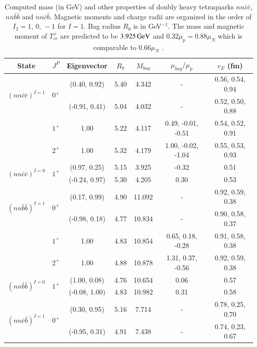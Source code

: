 \documentclass[12pt,prd,onecolumn,floatfix,nofootinbib]{revtex4}
\begin{document}
\renewcommand{\tabcolsep}{0.33cm} \renewcommand{\arraystretch}{1.1}
\begin{table}[!htb]
\caption{Computed mass (in GeV) and other properties of doubly heavy
tetraquarks $nn\bar{c}\bar{c}$, $nn\bar{b}\bar{b}$ and $nn\bar{c}\bar{b}$.
Magnetic moments and charge radii are organized in the order of $%
I_{3}=1,\,0,\,-1$ for $I=1$. Bag radius $R_{0}$ is in GeV$^{-1}$.
The mass and magnetic moment of $T_{cc}^{+}$ are predicted to be $3.925\,{\rm GeV}$ 
and $0.32\mu_{p}=0.88\mu_{N}$ which is comparable to $0.66\mu_{N}$ \cite%
{Azizi:2021aib}. }
\label{tab:2heavytetraquark1}%
\begin{tabular}{ccccccc}
\hline\hline
\textrm{State} & $J^{P}$ & \textrm{Eigenvector} & $R_{0}$ & $M_{bag}$ & $%
\mu_{bag}/\mu_{p}$ & $r_{E}$ (fm) \\ \hline
\multirow{2}{*}{${(nn\bar{c}\bar{c})}^{I=1}$} & \multirow{2}{*}{$0^{+}$} &
(0.40, 0.92) & 5.40 & 4.342 & - & 0.56, 0.54, 0.94 \\
&  & (-0.91, 0.41) & 5.04 & 4.032 & - & 0.52, 0.50, 0.88 \\
& $1^{+}$ & 1.00 & 5.22 & 4.117 & 0.49, -0.01, -0.51 & 0.54, 0.52, 0.91 \\
& $2^{+}$ & 1.00 & 5.32 & 4.179 & 1.00, -0.02, -1.04 & 0.55, 0.53, 0.93 \\
\multirow{2}{*}{${(nn\bar{c}\bar{c})}^{I=0}$} & \multirow{2}{*}{$1^{+}$} &
(0.97, 0.25) & 5.15 & 3.925 & -0.32 & 0.51 \\
&  & (-0.24, 0.97) & 5.30 & 4.205 & 0.30 & 0.53 \\
\multirow{2}{*}{${(nn\bar{b}\bar{b})}^{I=1}$} & \multirow{2}{*}{$0^{+}$} &
(0.17, 0.99) & 4.90 & 11.092 & - & 0.92, 0.59, 0.38 \\
&  & (-0.98, 0.18) & 4.77 & 10.834 & - & 0.90, 0.58, 0.37 \\
& $1^{+}$ & 1.00 & 4.83 & 10.854 & 0.65, 0.18, -0.28 & 0.91, 0.58, 0.38 \\
& $2^{+}$ & 1.00 & 4.88 & 10.878 & 1.31, 0.37, -0.56 & 0.92, 0.59, 0.38 \\
\multirow{2}{*}{${(nn\bar{b}\bar{b})}^{I=0}$} & \multirow{2}{*}{$1^{+}$} &
(1.00, 0.08) & 4.76 & 10.654 & 0.06 & 0.57 \\
&  & (-0.08, 1.00) & 4.83 & 10.982 & 0.31 & 0.58 \\
\multirow{2}{*}{${(nn\bar{c}\bar{b})}^{I=1}$} & \multirow{2}{*}{$0^{+}$} &
(0.30, 0.95) & 5.16 & 7.714 & - & 0.78, 0.25, 0.70 \\
&  & (-0.95, 0.31) & 4.91 & 7.438 & - & 0.74, 0.23, 0.67 \\

\end{tabular}
\end{table}
\end{document}
